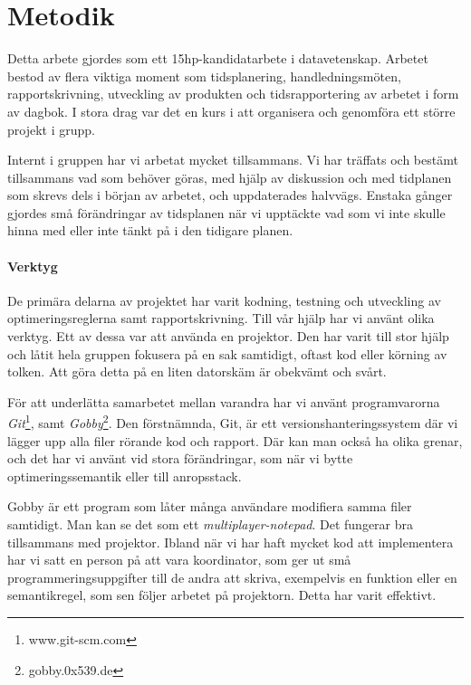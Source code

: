 \documentclass[../Appendix]{subfiles}
\begin{document}
\chapter{Metodik}

Detta arbete gjordes som ett 15hp-kandidatarbete i datavetenskap. Arbetet bestod
av flera viktiga moment som
    tidsplanering,
    handledningsmöten,
    rapportskrivning,
    utveckling av produkten och
    tidsrapportering av arbetet i form av dagbok. I stora drag
var det en kurs i att organisera och genomföra ett större projekt i grupp.


Internt i gruppen har vi arbetat mycket tillsammans. Vi har träffats och
bestämt tillsammans vad som behöver göras, med hjälp av diskussion och med
tidplanen som skrevs dels i början av arbetet, och uppdaterades halvvägs. 
Enstaka gånger gjordes små förändringar av tidsplanen när vi upptäckte
vad som vi inte skulle hinna med eller inte tänkt på i den tidigare planen.

\subsubsection{Verktyg}

    De primära delarna av projektet har varit kodning, testning och utveckling
av optimeringsreglerna samt rapportskrivning. Till vår hjälp har vi använt
olika verktyg. Ett av dessa var att använda en projektor. Den har varit till
stor hjälp och låtit hela gruppen fokusera på en sak samtidigt, oftast kod
eller körning av tolken. Att göra detta på en liten datorskäm är
obekvämt och svårt.


    För att underlätta samarbetet mellan varandra har vi använt programvarorna
\emph{Git}\footnote{www.git-scm.com}, samt \emph{Gobby}\footnote{gobby.0x539.de}.
Den förstnämnda, Git, är ett versionshanteringssystem där vi lägger upp alla
filer rörande kod och rapport. Där kan man också ha olika grenar, och det har 
vi använt vid stora förändringar, som när vi bytte optimeringssemantik eller
till anropsstack.

    Gobby är ett program som låter många användare modifiera samma filer
samtidigt. Man kan se det som ett \emph{multiplayer-notepad}. Det fungerar bra
tillsammans med projektor. Ibland när vi har haft mycket kod att implementera
har vi satt en person på att vara koordinator, som ger ut små
programmeringsuppgifter till de andra att skriva, exempelvis en funktion eller
en semantikregel, som sen följer arbetet på projektorn. Detta har varit 
effektivt.
\end{document}
